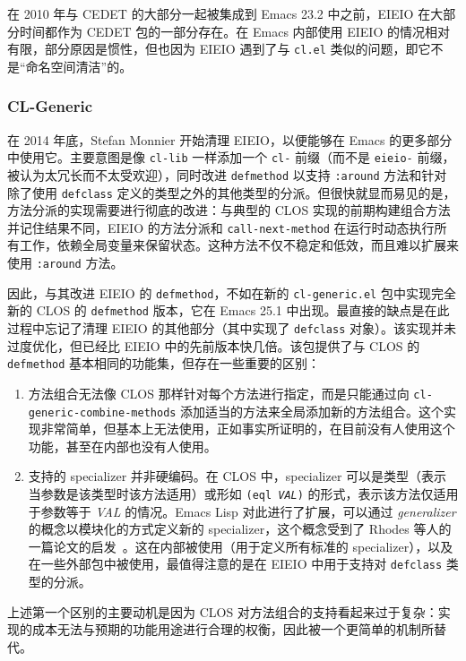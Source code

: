 \documentclass[format=acmsmall,screen]{acmart}
\newcommand \id[1] {\textrm{\textsl{#1}}}
\begin{document}
在 2010 年与 CEDET 的大部分一起被集成到 Emacs 23.2 中之前，EIEIO 在大部分时间都作为 CEDET 包的一部分存在。在 Emacs 内部使用 EIEIO 的情况相对有限，部分原因是惯性，但也因为 EIEIO 遇到了与 \texttt{cl.el} 类似的问题，即它不是“命名空间清洁”的。

\subsubsection{CL-Generic}

在 2014 年底，Stefan Monnier 开始清理 EIEIO，以便能够在 Emacs 的更多部分中使用它。主要意图是像 \texttt{cl-lib} 一样添加一个 \texttt{cl-} 前缀（而不是 \texttt{eieio-} 前缀，被认为太冗长而不太受欢迎），同时改进 \texttt{defmethod} 以支持 \texttt{:around} 方法和针对除了使用 \texttt{defclass} 定义的类型之外的其他类型的分派。但很快就显而易见的是，方法分派的实现需要进行彻底的改进：与典型的 CLOS 实现的前期构建组合方法并记住结果不同，EIEIO 的方法分派和 \texttt{call-next-method} 在运行时动态执行所有工作，依赖全局变量来保留状态。这种方法不仅不稳定和低效，而且难以扩展来使用 \texttt{:around} 方法。

因此，与其改进 EIEIO 的 \texttt{defmethod}，不如在新的 \texttt{cl-generic.el} 包中实现完全新的 CLOS 的 \texttt{defmethod} 版本，它在 Emacs 25.1 中出现。最直接的缺点是在此过程中忘记了清理 EIEIO 的其他部分（其中实现了 \texttt{defclass} 对象）。该实现并未过度优化，但已经比 EIEIO 中的先前版本快几倍。该包提供了与 CLOS 的 \texttt{defmethod} 基本相同的功能集，但存在一些重要的区别：

\begin{enumerate}
\item 方法组合无法像 CLOS 那样针对每个方法进行指定，而是只能通过向 \texttt{cl-generic-combine-methods} 添加适当的方法来全局添加新的方法组合。这个实现非常简单，但基本上无法使用，正如事实所证明的，在目前没有人使用这个功能，甚至在内部也没有人使用。
\item 支持的 specializer 并非硬编码。在 CLOS 中，specializer 可以是类型（表示当参数是该类型时该方法适用）或形如 \texttt{(eql \id{VAL})} 的形式，表示该方法仅适用于参数等于 \id{VAL} 的情况。Emacs Lisp 对此进行了扩展，可以通过 \emph{generalizer} 的概念以模块化的方式定义新的 specializer，这个概念受到了 Rhodes 等人的一篇论文的启发~\cite{Rhodes14}。这在内部被使用（用于定义所有标准的 specializer），以及在一些外部包中被使用，最值得注意的是在 EIEIO 中用于支持对 \texttt{defclass} 类型的分派。
\end{enumerate}

上述第一个区别的主要动机是因为 CLOS 对方法组合的支持看起来过于复杂：实现的成本无法与预期的功能用途进行合理的权衡，因此被一个更简单的机制所替代。
\end{document}
